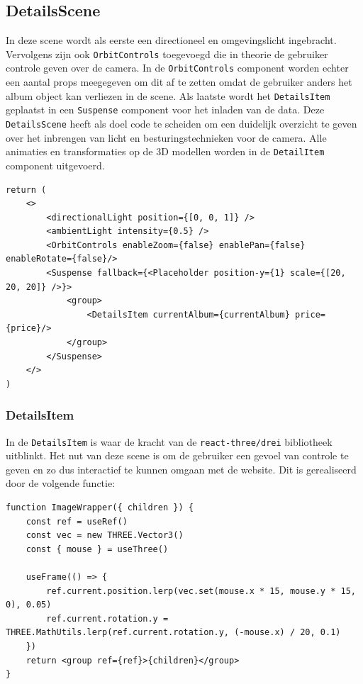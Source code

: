 \subsection{DetailsScene}

In deze scene wordt als eerste een directioneel en omgevingslicht ingebracht. Vervolgens zijn ook \texttt{OrbitControls} toegevoegd die in theorie de gebruiker controle geven over de camera. In de \texttt{OrbitControls} component worden echter een aantal props meegegeven om dit af te zetten omdat de gebruiker anders het album object kan verliezen in de scene. Als laatste wordt het \texttt{DetailsItem} geplaatst in een \texttt{Suspense} component voor het inladen van de data.
Deze \texttt{DetailsScene} heeft als doel code te scheiden om een duidelijk overzicht te geven over het inbrengen van licht en besturingstechnieken voor de camera. Alle animaties en transformaties op de 3D modellen worden in de \texttt{DetailItem} component uitgevoerd.

\begin{lstlisting}
return (
	<>
		<directionalLight position={[0, 0, 1]} />
		<ambientLight intensity={0.5} />
		<OrbitControls enableZoom={false} enablePan={false} enableRotate={false}/>
		<Suspense fallback={<Placeholder position-y={1} scale={[20, 20, 20]} />}>
			<group>
				<DetailsItem currentAlbum={currentAlbum} price={price}/>
			</group>
		</Suspense>
	</>
)
\end{lstlisting}

\subsubsection{DetailsItem}

In de \texttt{DetailsItem} is waar de kracht van de \texttt{react-three/drei} bibliotheek uitblinkt. Het nut van deze scene is om de gebruiker een gevoel van controle te geven en zo dus interactief te kunnen omgaan met de website. Dit is gerealiseerd door de volgende functie:
\begin{lstlisting}
function ImageWrapper({ children }) {
	const ref = useRef()
	const vec = new THREE.Vector3()
	const { mouse } = useThree()
	
	useFrame(() => {
		ref.current.position.lerp(vec.set(mouse.x * 15, mouse.y * 15, 0), 0.05)
		ref.current.rotation.y = THREE.MathUtils.lerp(ref.current.rotation.y, (-mouse.x) / 20, 0.1)
	})
	return <group ref={ref}>{children}</group>
}
\end{lstlisting}

